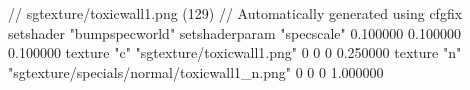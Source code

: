 // sgtexture/toxicwall1.png (129)
// Automatically generated using cfgfix
setshader "bumpspecworld"
setshaderparam "specscale" 0.100000 0.100000 0.100000
texture "c" "sgtexture/toxicwall1.png" 0 0 0 0.250000
texture "n" "sgtexture/specials/normal/toxicwall1_n.png" 0 0 0 1.000000
